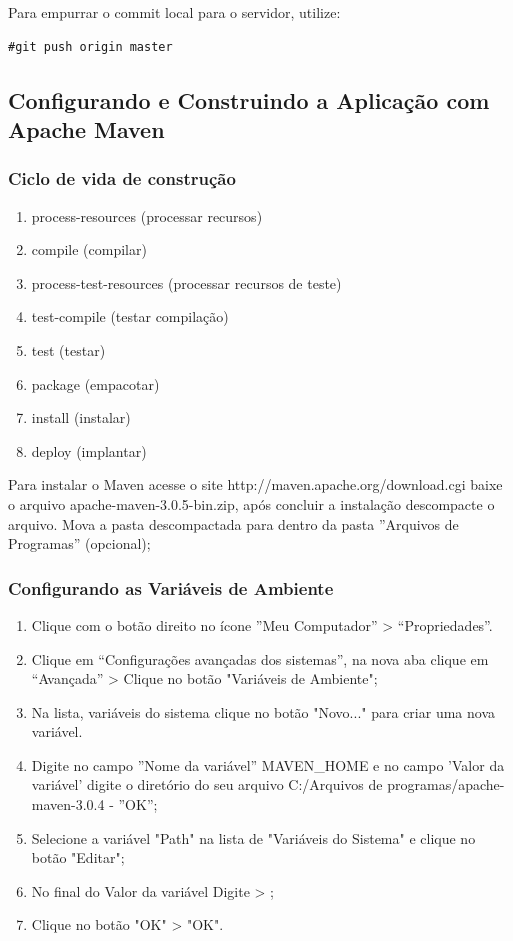 \documentclass[envcountsame,envcountchap]{svmono}
\begin{document}
Para empurrar o commit local para o servidor, utilize:

\begin{verbatim}
#git push origin master
\end{verbatim}

\subsection{Configurando e Construindo a Aplicação com Apache Maven}
	
\subsubsection{Ciclo de vida de construção}

\begin{enumerate}
	\item process-resources (processar recursos)
 	\item compile (compilar)
	\item process-test-resources (processar recursos de teste)
	\item test-compile (testar compilação)
	\item test (testar)
	\item package (empacotar)
	\item install (instalar)
	\item deploy (implantar)
\end{enumerate}
	
Para instalar o Maven acesse o site http://maven.apache.org/download.cgi baixe o arquivo apache-maven-3.0.5-bin.zip, após concluir a instalação descompacte o arquivo. Mova a pasta descompactada para dentro da pasta ''Arquivos de Programas'' (opcional);

\subsubsection{Configurando as Variáveis de Ambiente}

\begin{enumerate}
\item Clique com o botão direito no ícone ''Meu Computador” > “Propriedades”.
\item Clique em “Configurações avançadas dos sistemas”, na nova aba clique em “Avançada” > Clique no botão  "Variáveis de Ambiente";
\item Na lista, variáveis do sistema clique no botão "Novo..." para criar uma nova variável.
\item Digite no campo ''Nome da variável'' MAVEN\_HOME e no campo 'Valor da variável' digite o diretório do seu arquivo C:/Arquivos de programas/apache-maven-3.0.4 - ''OK'';
\item Selecione a variável "Path" na lista de "Variáveis do Sistema" e clique no botão "Editar";
\item No final do Valor da variável Digite > ;%
\item Clique no botão "OK" > "OK".
\end{enumerate}
\end{document}
